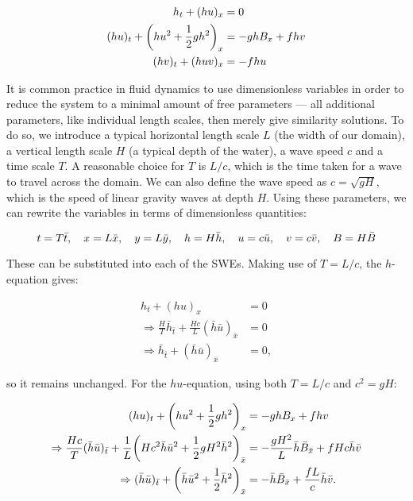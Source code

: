 \begin{subequations}
  \label{eq:swe}
  \begin{align}
                           h_t + (hu)_x & = 0 \\
    (hu)_t + \qty(hu^2 + \frac{1}{2}gh^2)_x & = - ghB_x + fhv \\
                       (hv)_t + (huv)_x & = - fhu
  \end{align}
\end{subequations}

It is common practice in fluid dynamics to use dimensionless variables in order to reduce the system to a minimal amount of free parameters --- all additional parameters, like individual length scales, then merely give similarity solutions. To do so, we introduce a typical horizontal length scale $L$ (the width of our domain), a vertical length scale $H$ (a typical depth of the water), a wave speed $c$ and a time scale $T$. A reasonable choice for $T$ is $L/c$, which is the time taken for a wave to travel across the domain. We can also define the wave speed as $c = \sqrt{gH}$, which is the speed of linear gravity waves at depth $H$. Using these parameters, we can rewrite the variables in terms of dimensionless quantities:

\begin{equation}
  t = T\bar t\qc x = L\bar x\qc y = L\bar y\qc h = H\bar h\qc u = c\bar u\qc v = c\bar v\qc B = H\bar B \label{eq:scaling}
\end{equation}

These can be substituted into each of the SWEs. Making use of $T = L/c$, the $h$-equation gives:


\begin{align}
  h_t + (hu)_x & = 0 \\
  \Rightarrow \frac{H}{T} \bar h_{\bar t} + \frac{Hc}{L} (\bar h \bar u)_{\bar x} & = 0 \\
  \Rightarrow \bar h_{\bar t} + (\bar h \bar u)_{\bar x} & = 0,
\end{align}

so it remains unchanged. For the $hu$-equation, using both $T = L/c$ and $c^2 = gH$:

\begin{align}
  (hu)_t + \qty(hu^2 + \frac{1}{2}gh^2)_x & = - ghB_x + fhv \\
  \Rightarrow \frac{Hc}{T}(\bar h\bar u)_{\bar t} + \frac{1}{L}\qty(Hc^2 \bar h\bar u^2 + \frac{1}{2}gH^2\bar h^2)_{\bar x} & = - \frac{gH^2}{L}\bar h\bar B_{\bar x} + fHc\bar h\bar v \\
  \Rightarrow (\bar h\bar u)_{\bar t} + \qty(\bar h\bar u^2 + \frac{1}{2} \bar h^2)_{\bar x} & = - \bar h\bar B_{\bar x} + \frac{fL}{c}\bar h\bar v.
\end{align}

